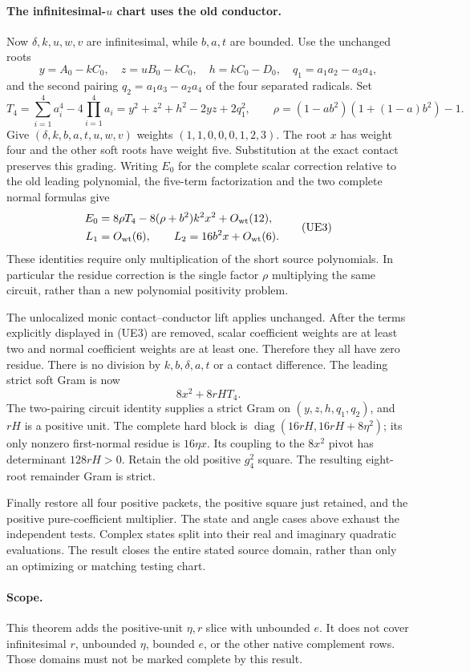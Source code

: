 \paragraph{The infinitesimal-$u$ chart uses the old conductor.}
Now $\delta,k,u,w,v$ are infinitesimal, while $b,a,t$ are bounded.
Use the unchanged roots
\[
 y=A_0-kC_0,\quad z=uB_0-kC_0,\quad h=kC_0-D_0,
 \quad q_1=a_1a_2-a_3a_4,
\]
and the second pairing $q_2=a_1a_3-a_2a_4$ of the four separated
radicals. Set
\[
 T_4=\sum_{i=1}^4a_i^4-4\prod_{i=1}^4a_i
     =y^2+z^2+h^2-2yz+2q_1^2,
 \qquad \rho=(1-ab^2)(1+(1-a)b^2)-1.
\]
Give $(\delta,k,b,a,t,u,w,v)$ weights $(1,1,0,0,0,1,2,3)$.
The root $x$ has weight four and the other soft roots have weight
five. Substitution at the exact contact preserves this grading.
Writing $E_0$ for the complete scalar correction relative to the
old leading polynomial, the five-term factorization and the two
complete normal formulas give
\[
 \begin{aligned}
 E_0&=8\rho T_4-8(\rho+b^2)k^2x^2+O_{\rm wt}(12),\\
 L_1&=O_{\rm wt}(6),\qquad
 L_2=16b^2x+O_{\rm wt}(6).
 \end{aligned}\tag{UE3}
\]
These identities require only multiplication of the short source
polynomials. In particular the residue correction is the single
factor $\rho$ multiplying the same circuit, rather than a new
polynomial positivity problem.

The unlocalized monic contact--conductor lift applies unchanged.
After the terms explicitly displayed in (UE3) are removed, scalar
coefficient weights are at least two and normal coefficient weights
are at least one. Therefore they all have zero residue. There is no
division by $k,b,\delta,a,t$ or a contact difference. The leading
strict soft Gram is now
\[
                  8x^2+8rH T_4.
\]
The two-pairing circuit identity supplies a strict Gram on
$(y,z,h,q_1,q_2)$, and $rH$ is a positive unit. The complete hard
block is $\operatorname{diag}(16rH,16rH+8\eta^2)$; its only
nonzero first-normal residue is $16\eta x$. Its coupling to the
$8x^2$ pivot has determinant $128rH>0$. Retain the old positive
$g_4^2$ square. The resulting eight-root remainder Gram is strict.

Finally restore all four positive packets, the positive square just
retained, and the positive pure-coefficient multiplier. The state and
angle cases above exhaust the independent tests. Complex states split
into their real and imaginary quadratic evaluations. The result
closes the entire stated source domain, rather than only an optimizing
or matching testing chart.

\paragraph{Scope.}
This theorem adds the positive-unit $\eta,r$ slice with unbounded
$e$. It does not cover infinitesimal $r$, unbounded $\eta$, bounded
$e$, or the other native complement rows. Those domains must not be
marked complete by this result.
